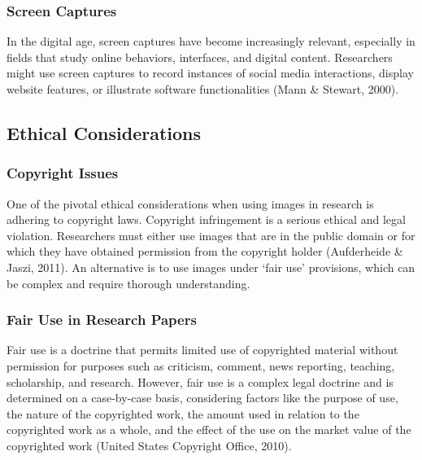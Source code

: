 \documentclass[
  b5paper]{book}
\begin{document}
\hypertarget{screen-captures}{%
\subsubsection{Screen Captures}\label{screen-captures}}

In the digital age, screen captures have become increasingly relevant, especially in fields that study online behaviors, interfaces, and digital content. Researchers might use screen captures to record instances of social media interactions, display website features, or illustrate software functionalities (Mann \& Stewart, 2000).

\hypertarget{ethical-considerations-8}{%
\subsection{Ethical Considerations}\label{ethical-considerations-8}}

\hypertarget{copyright-issues}{%
\subsubsection{Copyright Issues}\label{copyright-issues}}

One of the pivotal ethical considerations when using images in research is adhering to copyright laws. Copyright infringement is a serious ethical and legal violation. Researchers must either use images that are in the public domain or for which they have obtained permission from the copyright holder (Aufderheide \& Jaszi, 2011). An alternative is to use images under `fair use' provisions, which can be complex and require thorough understanding.

\hypertarget{fair-use-in-research-papers}{%
\subsubsection{Fair Use in Research Papers}\label{fair-use-in-research-papers}}

Fair use is a doctrine that permits limited use of copyrighted material without permission for purposes such as criticism, comment, news reporting, teaching, scholarship, and research. However, fair use is a complex legal doctrine and is determined on a case-by-case basis, considering factors like the purpose of use, the nature of the copyrighted work, the amount used in relation to the copyrighted work as a whole, and the effect of the use on the market value of the copyrighted work (United States Copyright Office, 2010).
\end{document}
